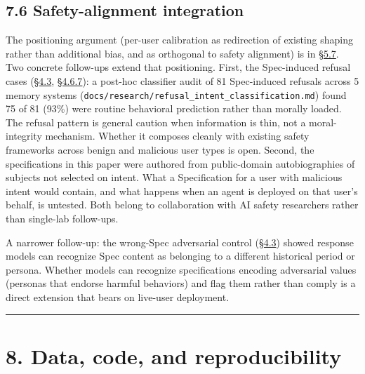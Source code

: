 \hypertarget{safety-alignment-integration}{%
\subsection{7.6 Safety-alignment
integration}\label{safety-alignment-integration}}

The positioning argument (per-user calibration as redirection of
existing shaping rather than additional bias, and as orthogonal to
safety alignment) is in \hyperref[privacy-and-the-case-for-user-held-representation]{§5.7}. Two concrete follow-ups extend that
positioning. First, the Spec-induced refusal cases (\hyperref[mechanism-correct-content-not-format]{§4.3}, \hyperref[rubric-handling-limitations-post-hoc-validity-audit-1]{§4.6.7}): a
post-hoc classifier audit of 81 Spec-induced refusals across 5 memory
systems (\texttt{docs/research/refusal\_intent\_classification.md})
found 75 of 81 (93\%) were routine behavioral prediction rather than
morally loaded. The refusal pattern is general caution when information
is thin, not a moral-integrity mechanism. Whether it composes cleanly
with existing safety frameworks across benign and malicious user types
is open. Second, the specifications in this paper were authored from
public-domain autobiographies of subjects not selected on intent. What a
Specification for a user with malicious intent would contain, and what
happens when an agent is deployed on that user's behalf, is untested.
Both belong to collaboration with AI safety researchers rather than
single-lab follow-ups.

A narrower follow-up: the wrong-Spec adversarial control (\hyperref[mechanism-correct-content-not-format]{§4.3}) showed
response models can recognize Spec content as belonging to a different
historical period or persona. Whether models can recognize
specifications encoding adversarial values (personas that endorse
harmful behaviors) and flag them rather than comply is a direct
extension that bears on live-user deployment.

\begin{center}\rule{0.5\linewidth}{0.5pt}\end{center}

\hypertarget{data-code-and-reproducibility}{%
\section{8. Data, code, and
reproducibility}\label{data-code-and-reproducibility}}

